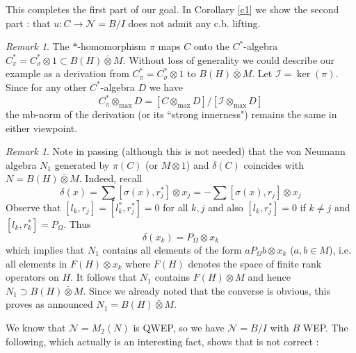 \documentclass[11pt,leqno]{article}
\newcommand{\cl}[1]{\mathcal{#1}}
\theoremstyle{plain}
\theoremstyle{definition}
\theoremstyle{remark}
\newtheorem{rem}[thm]{Remark}
\numberwithin{equation}{section}
\def\d{\delta}
\def\d{\delta}
\def\I{\cl  I}
\begin{document}
This completes the first part of our goal.  In Corollary \ref{c1}
we   show the second part : that $u: C \to \cl N=B/I$ does not admit any c.b. lifting. 

             
       \begin{rem} The $*$-homomorphism $\pi$ maps $C$ onto
       the $C^*$-algebra $C^*_\pi =C^*_\sigma \otimes 1 \subset B(H)\bar\otimes M $. 
       Without loss of generality we could describe our example as a derivation
       from $C^*_\pi=C^*_\sigma \otimes 1$ to $B(H)\bar\otimes M $. 
       Let $\I=\ker(\pi)$.
       Since for any other $C^*$-algebra $D$ we have $$C^*_\pi \otimes_{\max} D=
       [C \otimes_{\max} D]/ [\I \otimes_{\max} D]$$ 
       the mb-norm of the derivation (or its ``strong innerness") remains the same in either viewpoint.
   \end{rem}   
   
       \begin{rem} Note in passing (although this is not needed) that the     von Neumann algebra  $N_1$ generated   by
        $\pi(C) $   (or $M\otimes 1 $)  and $\d(C) $  coincides with  $N=B(H) \bar \otimes M$.  
        Indeed, recall
        $$\d(x)= \sum [\sigma(x)  ,   r_j^*] \otimes x_j = - \sum [\sigma(x)  ,   r_j] \otimes x_j $$
                Observe that
        $[l_k, r_j]=[l_k^*, r_j^*]=0 $ for all $k,j$ and also  $[l_k, r_j^*]= 0$ if $k\not=j$
        and $[l_k, r_k^*]= P_\Omega$. Thus
        $$\d(x_k)= P_\Omega \otimes x_k$$
        which implies that $N_1$ contains
        all elements of the form $a P_\Omega b \otimes x_k$ ($a,b\in M$), i.e.
        all elements in $F(H) \otimes x_k$ where $F(H)$ denotes the space of finite rank operators on $H$.
        It follows that $N_1$ contains $F(H) \otimes M $
        and hence $N_1\supset B(H) \bar \otimes M$. Since we already noted that the converse
        is obvious, this proves as announced $N_1=B(H) \bar \otimes M$.
        \end{rem}
       
    We know that $\cl N=M_2( N) $ is QWEP,
    so we have $\cl N =B/I$ with $B$ WEP.
       The following, 
    which actually is an interesting fact, 
    shows that   \cite[Lemma 2.3]{[19]} is not correct :
    
\end{document}
